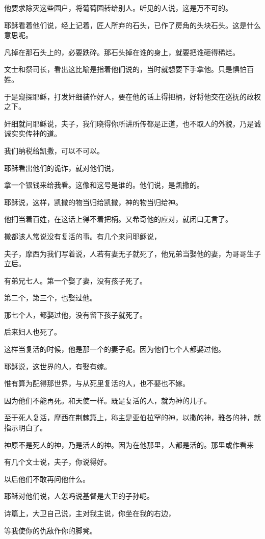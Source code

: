 \documentclass[12pt,oneside]{book}
\begin{document}
他要求除灭这些园户，将葡萄园转给别人。听见的人说，这是万不可的。

耶稣看着他们说，经上记着，匠人所弃的石头，已作了房角的头块石头。这是什么意思呢。

凡掉在那石头上的，必要跌碎。那石头掉在谁的身上，就要把谁砸得稀烂。

文士和祭司长，看出这比喻是指着他们说的，当时就想要下手拿他。只是惧怕百姓。

于是窥探耶稣，打发奸细装作好人，要在他的话上得把柄，好将他交在巡抚的政权之下。

奸细就问耶稣说，夫子，我们晓得你所讲所传都是正道，也不取人的外貌，乃是诚诚实实传神的道。

我们纳税给凯撒，可以不可以。

耶稣看出他们的诡诈，就对他们说，

拿一个银钱来给我看。这像和这号是谁的。他们说，是凯撒的。

耶稣说，这样，凯撒的物当归给凯撒，神的物当归给神。

他扪当着百姓，在这话上得不着把柄。又希奇他的应对，就闭口无言了。

撒都该人常说没有复活的事。有几个来问耶稣说，

夫子，摩西为我们写着说，人若有妻无子就死了，他兄弟当娶他的妻，为哥哥生子立后。

有弟兄七人。第一个娶了妻，没有孩子死了。

第二个，第三个，也娶过他。

那七个人，都娶过他，没有留下孩子就死了。

后来妇人也死了。

这样当复活的时候，他是那一个的妻子呢。因为他们七个人都娶过他。

耶稣说，这世界的人，有娶有嫁。

惟有算为配得那世界，与从死里复活的人，也不娶也不嫁。

因为他们不能再死。和天使一样。既是复活的人，就为神的儿子。

至于死人复活，摩西在荆棘篇上，称主是亚伯拉罕的神，以撒的神，雅各的神，就指示明白了。

神原不是死人的神，乃是活人的神。因为在他那里，人都是活的。那里或作看来

有几个文士说，夫子，你说得好。

以后他们不敢再问他什么。

耶稣对他们说，人怎吗说基督是大卫的子孙呢。

诗篇上，大卫自己说，主对我主说，你坐在我的右边，

等我使你的仇敌作你的脚凳。
\end{document}
